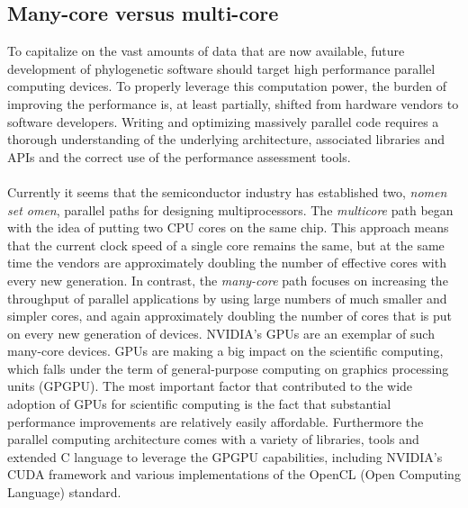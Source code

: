 \subsection{Many-core versus multi-core}

To capitalize on the vast amounts of data that are now available, future development of phylogenetic software should target high performance parallel computing devices.
To properly leverage this computation power, the burden of improving the performance is, at least partially, shifted from hardware vendors to software developers.
Writing and optimizing massively parallel code requires a thorough understanding of the underlying architecture, associated libraries and APIs and the correct use of the performance assessment tools.

\paragraph{}
Currently it seems that the semiconductor industry has established two, \textit{nomen set omen}, parallel paths for designing multiprocessors.
The \textit{multicore} path began with the idea of putting two CPU cores on the same chip.
This approach means that the current clock speed of a single core remains the same, but at the same time the vendors are approximately doubling the number of effective cores with every new generation.
In contrast, the \textit{many-core} path focuses on increasing the throughput of parallel applications by using large numbers of much smaller and simpler cores, and again approximately doubling the number of cores that is put on every new generation of devices. 
NVIDIA's GPUs are an exemplar of such many-core devices.
GPUs \citep{Nickolls2008} are making a big impact on the scientific computing, which falls under the term of general-purpose computing on graphics processing units (GPGPU).
The most important factor that contributed to the wide adoption of GPUs for scientific computing is the fact that substantial performance improvements are relatively easily affordable. 
Furthermore the parallel computing architecture comes with a variety of libraries, tools and extended C language to leverage the GPGPU capabilities, including NVIDIA's CUDA framework and various implementations of the OpenCL (Open Computing Language) standard.

